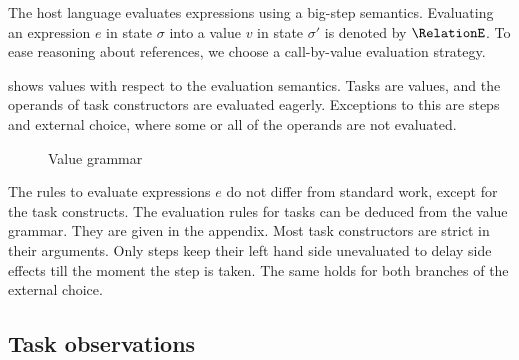 The host language evaluates expressions using a big-step semantics.
Evaluating an expression $e$ in state $\sigma$ into a value $v$ in state $\sigma'$ is denoted by $\RelationE$.
To ease reasoning about references, we choose a call-by-value evaluation strategy.

 shows values with respect to the evaluation semantics.
Tasks are values, and the operands of task constructors are evaluated eagerly.
Exceptions to this are steps and external choice, where some or all of the operands are not evaluated.

\begin{figure}[h]
  \small
  \caption{Value grammar} \label{fig:value-grammar}
\end{figure}


The rules to evaluate expressions $e$ do not differ from standard work, except for the task constructs.
The evaluation rules for tasks can be deduced from the value grammar.
They are given in the appendix.
Most task constructors are strict in their arguments.
Only steps keep their left hand side unevaluated to delay side effects till the moment the step is taken.
The same holds for both branches of the external choice.

%
%


\subsection{Task observations}


